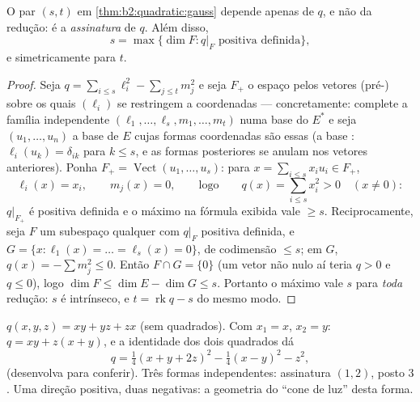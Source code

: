 \begin{theorem}\label{thm:b2:quadratic:sylvester}
O par $(s, t)$ em \cref{thm:b2:quadratic:gauss} depende apenas de
$q$, e não da redução: é a
\emph{assinatura} de $q$.
Além disso,
\[
s = \max\{\dim F : q|_F \text{ positiva definida}\},
\]
e simetricamente para $t$.
\end{theorem}

\begin{proof}
Seja $q = \sum_{i \leq s}\ell_i^2 - \sum_{j\leq t} m_j^2$ e seja
$F_+$ o espaço  pelos vetores (pré-) sobre os quais $(\ell_i)$
se restringem a coordenadas --- concretamente: complete a
família independente $(\ell_1, \dots, \ell_s, m_1, \dots, m_t)$
numa base do  $E^*$ e seja $(u_1, \dots, u_n)$
a base de $E$ cujas formas coordenadas são essas (a base
: $\ell_i(u_k) = \delta_{ik}$ para $k \leq s$,
e as formas posteriores se anulam nos vetores anteriores). Ponha $F_+ =
\operatorname{Vect}(u_1, \dots, u_s)$: para $x = \sum_{i\leq
s}x_iu_i \in F_+$,
\[
\ell_i(x) = x_i,
\qquad m_j(x) = 0,
\qquad\text{logo}\qquad
q(x) = \sum_{i\leq s}x_i^2 > 0 \quad (x \neq 0) :
\]
$q|_{F_+}$ é positiva definida e o máximo na fórmula exibida
vale $\geq s$. Reciprocamente, seja $F$ um subespaço qualquer com $q|_F$
positiva definida, e $G = \{x : \ell_1(x) = \dots = \ell_s(x) =
0\}$, de codimensão $\leq s$; em $G$, $q(x) = -\sum m_j^2 \leq 0$.
Então $F \cap G = \{0\}$ (um vetor não nulo aí teria $q > 0$
e $q \leq 0$), logo $\dim F \leq \dim E - \dim G \leq s$. Portanto o
máximo vale $s$ para \emph{toda} redução: $s$ é intrínseco, e $t
= \operatorname{rk} q - s$ do mesmo modo.
\end{proof}

\begin{example}\label{ex:b2:quadratic:gaussexample}
$q(x, y, z) = xy + yz + zx$ (sem quadrados). Com $x_1 = x$, $x_2 =
y$: $q = xy + z(x + y)$, e a identidade dos dois quadrados dá
\[
q = \tfrac14(x + y + 2z)^2 - \tfrac14(x - y)^2 - z^2 ,
\]
(desenvolva para conferir). Três formas independentes: assinatura $(1, 2)$,
posto $3$. Uma direção positiva, duas negativas: a geometria do ``cone
de luz'' desta forma.
\end{example}

